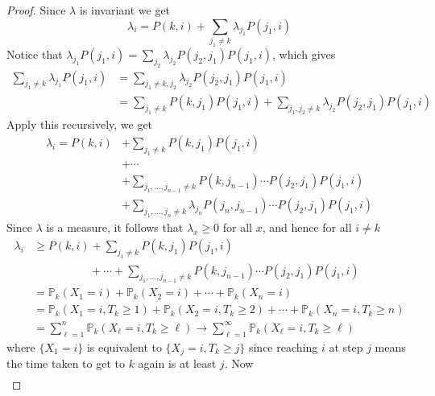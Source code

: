 \documentclass[a4paper]{article}
\begin{document}
\begin{proof}
    Since $\lambda$ is invariant we get
    \[
        \lambda_i =P(k, i) +\sum_{j_1 \neq k} \lambda_{j_1} P(j_1, i)
    \]
    Notice that $ \lambda_{j_1}P(j_1,i) = \sum_{j_2} \lambda_{j_2}P(j_{2},j_1)P(j_1,i) $, which gives 
    \begin{align*}
        \sum_{j_1 \neq k} \lambda_{j_1} P(j_1, i) &= \sum_{j_1\neq k, j_2}\lambda_{j_2}P(j_{2},j_1)P(j_1,i) \\ 
        &=  \sum_{j_1 \neq k} P\left(k, j_1\right) P\left(j_1, i\right)+ \sum_{j_1,j_2\neq k}\lambda_{j_2}P(j_{2},j_1)P(j_1,i)
    \end{align*}
    Apply this recursively, we get 
    \begin{align*}
        \lambda_i = P(k, i) &+\sum_{j_1 \neq k} P\left(k, j_1\right) P\left(j_1, i\right)\\ 
        &+\cdots\\ 
        &+\sum_{j_1, \ldots, j_{n-1} \neq k} P\left(k, j_{n-1}\right) \cdots P\left(j_2, j_1\right) P\left(j_1, i\right) \\
        &+\sum_{j_1, \ldots, j_n \neq k} \lambda_{j_n} P\left(j_n, j_{n-1}\right) \cdots P\left(j_2, j_1\right) P\left(j_1, i\right)
    \end{align*}
    Since $\lambda$ is a measure, it follows that $\lambda_x \geq 0$ for all $x$, and hence for all $i \neq k$
    \[
    \begin{aligned}
    \lambda_i & \geq P(k, i)+\sum_{j_1 \neq k} P\left(k, j_1\right) P\left(j_1, i\right)\\ 
    &\hspace{5em}+\cdots+\sum_{j_1, \ldots, j_{n-1} \neq k} P\left(k, j_{n-1}\right) \cdots P\left(j_2, j_1\right) P\left(j_1, i\right) \\
    &=\mathbb{P}_k\left(X_1=i\right)+\mathbb{P}_k\left(X_2=i\right)+\cdots+\mathbb{P}_k\left(X_n=i\right) \\
    &=\mathbb{P}_k\left(X_1=i, T_k \geq 1\right)+\mathbb{P}_k\left(X_2=i, T_k \geq 2\right)+\cdots+\mathbb{P}_k\left(X_n=i, T_k \geq n\right) \\
    &=\sum_{\ell=1}^n \mathbb{P}_k\left(X_{\ell}=i, T_k \geq \ell\right) \rightarrow \sum_{\ell=1}^{\infty} \mathbb{P}_k\left(X_{\ell}=i, T_k \geq \ell\right)
    \end{aligned}
    \]
    where $ \{X_1=i\} $ is equivalent to $\{X_j=i,T_k\ge j\}$ since reaching $i$ at step $j$ means the time taken to get to $k$ again is at least $j$. Now 
    \begin{align*}

\end{align*}
\end{proof}
\end{document}

